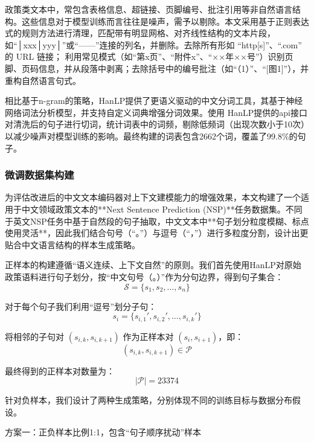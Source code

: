 \documentclass[12pt, a4paper]{ctexart}
\begin{document}
政策类文本中，常包含表格信息、超链接、页脚编号、批注引用等非自然语言结构。这些信息对于模型训练而言往往是噪声，需予以剔除。本文采用基于正则表达式的规则方法进行清理，匹配带有明显网格、对齐线性结构的文本片段，如“│xxx│yyy│”或“——”连接的列名，并删除。去除所有形如 “http[s]”、“.com” 的 URL 链接；
利用常见模式（如“第x页”、“附件x”、“××年××号”）识别页脚、页码信息，并从段落中剥离；去除括号中的编号批注（如“（1）”、“[图1]”），并重构自然语言句式。


相比基于n-gram的策略，HanLP提供了更语义驱动的中文分词工具，其基于神经网络词法分析模型，并支持自定义词典增强分词效果。使用 HanLP提供的api接口对清洗后的句子进行切词，统计词表中的词频，剔除低频词（出现次数小于10次）以减少噪声对模型训练的影响。最终构建的词表包含2662个词，覆盖了99.8\%的句子。

\subsubsection{微调数据集构建}
为评估改进后的中文文本编码器对上下文建模能力的增强效果，本文构建了一个适用于中文领域政策文本的**Next Sentence Prediction (NSP)**任务数据集。不同于英文NSP任务中基于自然段的句子抽取，中文文本中**句子划分粒度模糊、标点使用灵活**，因此我们结合句号（“。”）与逗号（“，”）进行多粒度分割，设计出更贴合中文语言结构的样本生成策略。

正样本的构建遵循“语义连续、上下文自然”的原则。我们首先使用HanLP对原始政策语料进行句子划分，按“中文句号（。）”作为分句边界，得到句子集合：
\begin{equation}
\mathcal{S} = \{s_1, s_2, \ldots, s_n\}
\end{equation}

对于每个句子我们利用“逗号”划分子句：
\begin{equation}
s_i = \{s_{i,1}', s_{i,2}', \ldots, s_{i,k}'\}
\end{equation}

将相邻的子句对 $(s_{i,k}, s_{i,k+1})$ 作为正样本对 $(s_i, s_{i+1})$，即：
\begin{equation}
(s_{i,k}, s_{i,k+1}) \in \mathcal{P}
\end{equation}

最终得到的正样本对数量为：
\begin{equation}
|\mathcal{P}| = 23374
\end{equation}

针对负样本，我们设计了两种生成策略，分别体现不同的训练目标与数据分布假设。

方案一：正负样本比例1:1，包含“句子顺序扰动”样本
\end{document}
